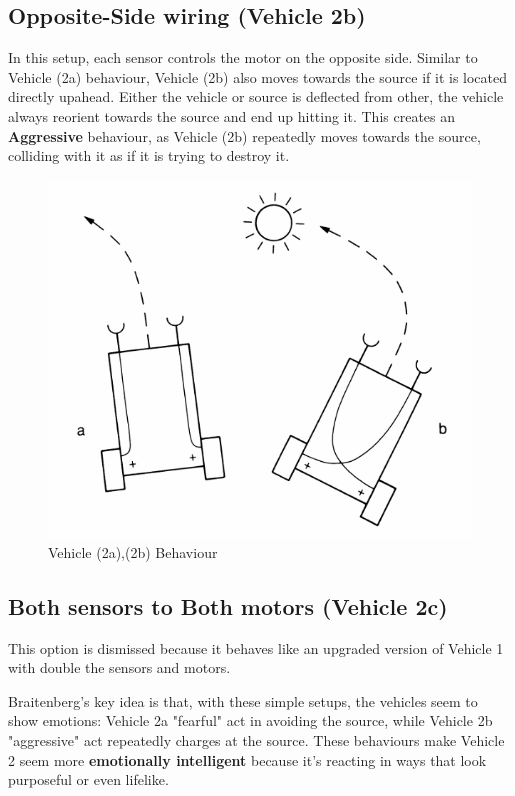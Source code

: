 \documentclass{article}
\begin{document}
	\subsection*{Opposite-Side wiring (Vehicle 2b)}
	In this setup, each sensor controls the motor on the opposite side. Similar to Vehicle (2a) behaviour, Vehicle (2b) also moves towards the source if it is located directly upahead. Either the vehicle or source is deflected from other, the vehicle always reorient towards the source and end up hitting it. This creates an \textbf{Aggressive} behaviour, as Vehicle (2b) repeatedly moves towards the source, colliding with it as if it is trying to destroy it. 

	\begin{figure}[h]
		\centering
		\includegraphics[scale=0.6]{images/Vehicle 2 Behaviour.png}
		\caption{Vehicle (2a),(2b) Behaviour }
		\label{fig:vehicle-2_behaviour}
	\end{figure}

	\subsection*{Both sensors to Both motors (Vehicle 2c)}
	This option is dismissed because it behaves like an upgraded version of Vehicle 1 with double the sensors and motors. 

	\newpage

	Braitenberg's key idea is that, with these simple setups, the vehicles seem to show emotions: Vehicle 2a "fearful" act in avoiding the source, while Vehicle 2b "aggressive" act repeatedly charges at the source. These behaviours make Vehicle 2 seem more \textbf{emotionally intelligent} because it's reacting in ways that look purposeful or even lifelike. 
\end{document}
